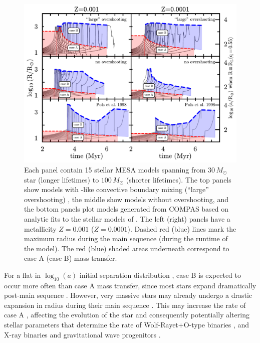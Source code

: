\documentclass[twocolumn]{aastex63}
\begin{document}
\begin{figure}[htbp]
  \centering
  \includegraphics[width=1.0\textwidth]{radii}
  \caption{Each panel contain 15 stellar \textsc{MESA} models spanning
    from $30 \, M_{\odot}$ star (longer lifetimes) to
    $100 \, M_{\odot}$ (shorter lifetimes). The top panels show models
    with \cite{brott:11}-like convective boundary mixing (``large''
    overshooting) \citep{claret:18}, the middle show models without
    overshooting, and the bottom panels plot models generated from
    \textsc{COMPAS} based on analytic fits to the stellar models of
    \cite{pols:98}. The left (right) panels have a metallicity
    $Z=0.001$ ($Z=0.0001$). Dashed red (blue) lines mark the maximum
    radius during the main sequence (during the runtime of the
    model). The red (blue) shaded areas underneath correspond to case
    A (case B) mass transfer.}
  \label{fig:radii}
\end{figure}


For a flat in $\log_{10}(a)$ initial separation distribution
\citep{opik:24}, case B is expected to occur more often than case A
mass transfer, since most stars expand dramatically post-main sequence
\citep[e.g.,][]{vandenheuvel:69}. However, very massive stars may
already undergo a drastic expansion in radius during their main
sequence \citep[e.g.,][]{sanyal:15, jiang:15}. This may increase the
rate of case A \citep{demink:08}, affecting the evolution of the star
and consequently potentially altering stellar parameters that
determine the rate of Wolf-Rayet+O-type binaries
\citep[e.g.,][]{nuijten:24}, and X-ray binaries and gravitational wave
progenitors \citep[e.g.,][]{mandel:22}.
\end{document}
